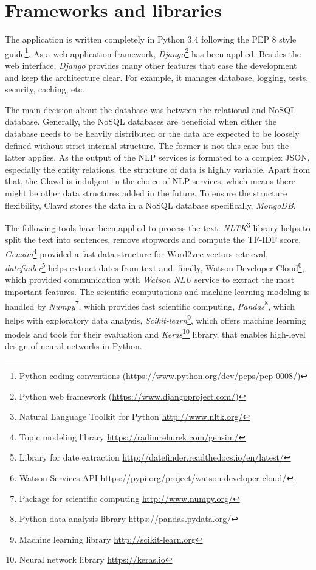 \documentclass[
  digital, %
  notable,   %
  nolof,     %
  nolot,     %
  draft
]{fithesis3}
\begin{document}
\section{Frameworks and libraries}
The application is written completely in Python 3.4 following the PEP 8 style guide\footnote{Python coding conventions (\url{https://www.python.org/dev/peps/pep-0008/})}.
As a web application framework, \textit{Django}\footnote{Python web framework (\url{https://www.djangoproject.com/})} has been applied.
Besides the web interface, \textit{Django} provides many other features that ease the development and keep the architecture clear.
For example, it manages database, logging, tests, security, caching, etc.

The main decision about the database was between the relational and NoSQL database.
Generally, the NoSQL databases are beneficial when either the database needs to be heavily distributed or the data are expected to be loosely defined without strict internal structure.
The former is not this case but the latter applies.
As the output of the NLP services is formated to a complex JSON, especially the entity relations, the structure of data is highly variable.
Apart from that, the Clawd is indulgent in the choice of NLP services, which means there might be other data structures added in the future.
To ensure the structure flexibility, Clawd stores the data in a NoSQL database specifically, \textit{MongoDB}.

The following tools have been applied to process the text:
\textit{NLTK}\footnote{Natural Language Toolkit for Python \url{http://www.nltk.org/}} library helps to split the text into sentences, remove stopwords and compute the TF-IDF score, 
\textit{Gensim}\footnote{Topic modeling library \url{https://radimrehurek.com/gensim/}} provided a fast data structure for Word2vec vectors retrieval, \textit{datefinder}\footnote{Library for date extraction \url{http://datefinder.readthedocs.io/en/latest/}}
helps extract dates from text and, finally,
Watson Developer Cloud\footnote{Watson Services API \url{https://pypi.org/project/watson-developer-cloud/}}, which provided communication with \textit{Watson NLU} service to extract the most important features.
The scientific computations and machine learning modeling is handled by \textit{Numpy}\footnote{Package for scientific computing \url{http://www.numpy.org/}}, which provides fast scientific computing,
\textit{Pandas}\footnote{Python data analysis library \url{https://pandas.pydata.org/}}, which helps with exploratory data analysis,
\textit{Scikit-learn}\footnote{Machine learning library \url{http://scikit-learn.org}}, which offers machine learning models and tools for their evaluation and
\textit{Keras}\footnote{Neural network library \url{https://keras.io}} library, that enables high-level design of neural networks in Python.
\end{document}
